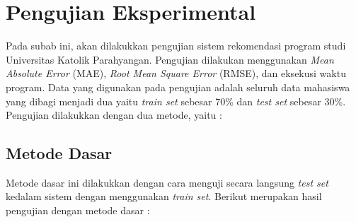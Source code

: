 \section{Pengujian Eksperimental}
\label{sec:pengujian eksperimental}

Pada subab ini, akan dilakukkan pengujian sistem rekomendasi program studi Universitas Katolik Parahyangan. Pengujian dilakukan menggunakan \textit{Mean Absolute Error} (MAE), \textit{Root Mean Square Error} (RMSE), dan eksekusi waktu program. Data yang digunakan pada pengujian adalah seluruh data mahasiswa yang dibagi menjadi dua yaitu \textit{train set} sebesar 70\% dan \textit{test set} sebesar 30\%. Pengujian dilakukkan dengan dua metode, yaitu : 

\subsection{Metode Dasar}
\label{subsec: metode dasar}

Metode dasar ini dilakukkan dengan cara menguji secara langsung \textit{test set} kedalam sistem dengan menggunakan \textit{train set}. Berikut merupakan hasil pengujian dengan metode dasar :

